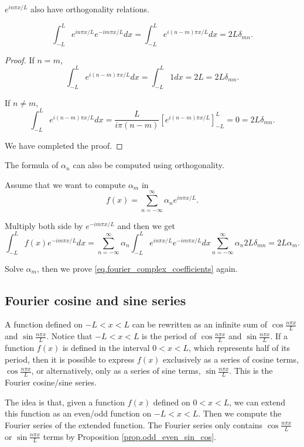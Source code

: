$e^{i n \pi x / L}$ also have orthogonality relations.

\begin{theorem}
\begin{equation}\label{eq.Fourier_complex_orthogonality}
    \int_{-L}^L e^{i n \pi x / L} e^{-i m \pi x / L} d x=\int_{-L}^L e^{i(n-m) \pi x / L} d x=2 L \delta_{m n}.
\end{equation}
\end{theorem}
\begin{proof}
If $n = m$, 
$$
\int_{-L}^L e^{i(n-m) \pi x / L} d x = \int_{-L}^L 1 d x = 2L = 2L\delta_{m n}.
$$

If $n \neq m$, 
$$
\int_{-L}^L e^{i(n-m) \pi x / L} d x = \frac{L}{i\pi(n-m)}\left[e^{i(n-m) \pi x / L}\right]^{L}_{-L} = 0 = 2L\delta_{m n}.
$$

We have completed the proof.
\end{proof}

The formula of $\alpha_n$ can also be computed using orthogonality.

Assume that we want to compute $\alpha_m$ in 
$$
f(x)=\sum_{n=-\infty}^{\infty} \alpha_n e^{i n \pi x / L}.
$$

Multiply both side by $e^{-i m \pi x / L}$ and then we get
$$
\int_{-L}^L f(x) e^{-i m \pi x / L} d x=\sum_{n=-\infty}^{\infty} \alpha_n \int_{-L}^Le^{i n \pi x / L} e^{- i m \pi x / L} dx \sum_{n=-\infty}^{\infty} \alpha_n 2L \delta_{m n} = 2L\alpha_m.
$$

Solve $\alpha_m$, then we prove \eqref{eq.fourier_complex_coefficients} again.

\subsection{Fourier cosine and sine series}\label{sec.fourier_cosine_sine}

A function defined on $-L<x<L$ can be rewritten as an infinite sum of $\cos \frac{n \pi x}{L}$ and $\sin \frac{n \pi x}{L}$. Notice that $-L<x<L$ is the period of $\cos \frac{n \pi x}{L}$ and $\sin \frac{n \pi x}{L}$. If a function $f(x)$ is defined in the interval $0 < x < L$, which represents half of its period, then it is possible to express $f(x)$ exclusively as a series of cosine terms, $\cos \frac{n \pi x}{L}$, or alternatively, only as a series of sine terms, $\sin \frac{n \pi x}{L}$. This is the Fourier cosine/sine series.

The idea is that, given a function $f(x)$ defined on $0 < x < L$, we can extend this function as an even/odd function on $-L < x < L$. Then we compute the Fourier series of the extended function. The Fourier series only contains $\cos \frac{n \pi x}{L}$ or $\sin \frac{n \pi x}{L}$ terms by Proposition \ref{prop.odd_even_sin_cos}.

